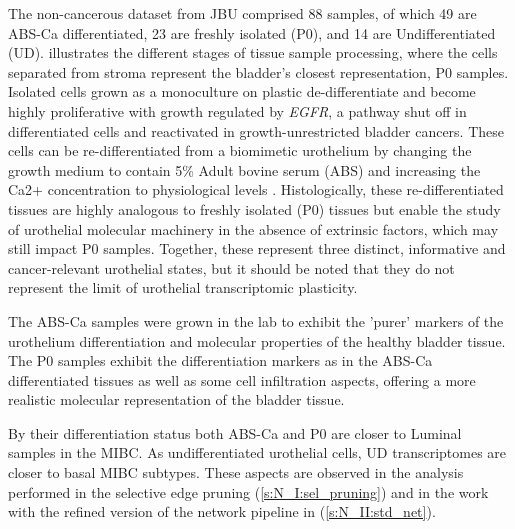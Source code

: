 The non-cancerous dataset from JBU comprised 88 samples, of which 49 are ABS-Ca differentiated, 23 are freshly isolated (P0), and 14 are Undifferentiated (UD).  illustrates the different stages of tissue sample processing, where the cells separated from stroma represent the bladder's closest representation, P0 samples. Isolated cells grown as a monoculture on plastic de-differentiate and become highly proliferative with growth regulated by \textit{EGFR}, a pathway shut off in differentiated cells and reactivated in growth-unrestricted bladder cancers. These cells can be re-differentiated from a biomimetic urothelium by changing the growth medium to contain 5\% Adult bovine serum (ABS) and increasing the Ca2+ concentration to physiological levels \citep{Cross2005-fe}. Histologically, these re-differentiated tissues are highly analogous to freshly isolated (P0) tissues but enable the study of urothelial molecular machinery in the absence of extrinsic factors, which may still impact P0 samples. Together, these represent three distinct, informative and cancer-relevant urothelial states, but it should be noted that they do not represent the limit of urothelial transcriptomic plasticity.


The ABS-Ca samples were grown in the lab to exhibit the 'purer' markers of the urothelium differentiation and molecular properties of the healthy bladder tissue. The P0 samples exhibit the differentiation markers as in the ABS-Ca differentiated tissues as well as some cell infiltration aspects, offering a more realistic molecular representation of the bladder tissue. 

By their differentiation status both ABS-Ca and P0 are closer to Luminal samples in the MIBC. As undifferentiated urothelial cells, UD transcriptomes are closer to basal MIBC subtypes. These aspects are observed in the analysis performed in the selective edge pruning (\cref{s:N_I:sel_pruning}) and in the work with the refined version of the network pipeline in (\cref{s:N_II:std_net}).


